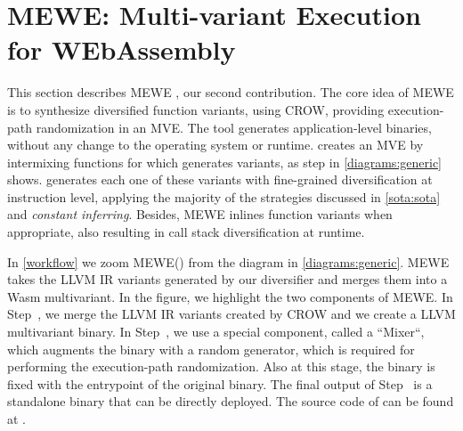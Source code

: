 \section{MEWE: Multi-variant Execution for WEbAssembly}
\label{section:mewe}

\newcommand{\tool}{MEWE\xspace}
\newcommand{\repourl}{TODO}
This section describes MEWE \cite{MEWE}, our second contribution. 
The core idea of \tool is to synthesize diversified function variants, using CROW, providing execution-path randomization in an MVE.
The tool generates application-level binaries, without any change to the operating system or \wasm runtime.
creates an MVE by intermixing functions for which generates variants, as step  in \autoref{diagrams:generic} shows.
generates each one of these variants with fine-grained diversification at instruction level, applying the majority of the strategies discussed in \autoref{sota:sota} and \emph{constant inferring}. Besides, \tool inlines function variants when appropriate, also resulting in call stack diversification at runtime.

In \autoref{workflow} we zoom MEWE() from the diagram in \autoref{diagrams:generic}. MEWE takes the LLVM IR variants generated by our diversifier and merges them into a Wasm multivariant.
In the figure, we highlight the two components of MEWE. 
In Step~, we merge the LLVM IR variants created by CROW and we create a LLVM multivariant binary.
In Step~, we use a special component, called a ``Mixer``,  which augments the binary with a random generator, which is required for performing the execution-path randomization. 
Also at this stage, the binary is fixed with the entrypoint of the original binary.
The final output of Step~ is a standalone \wasm binary that can be directly deployed. 
The source code of can be found at \todo{}.

